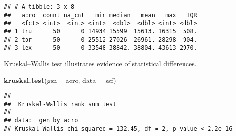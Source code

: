\documentclass[]{book}
\newenvironment{Shaded}{\begin{snugshade}}{\end{snugshade}}
\newcommand{\DataTypeTok}[1]{\textcolor[rgb]{0.13,0.29,0.53}{#1}}
\newcommand{\KeywordTok}[1]{\textcolor[rgb]{0.13,0.29,0.53}{\textbf{#1}}}
\newcommand{\NormalTok}[1]{#1}
\newcommand{\OperatorTok}[1]{\textcolor[rgb]{0.81,0.36,0.00}{\textbf{#1}}}
\newcommand{\OtherTok}[1]{\textcolor[rgb]{0.56,0.35,0.01}{#1}}
\newcommand{\StringTok}[1]{\textcolor[rgb]{0.31,0.60,0.02}{#1}}
\begin{document}
\begin{Shaded}
\end{Shaded}

\begin{verbatim}
## # A tibble: 3 x 8
##   acro  count na_cnt   min median   mean   max   IQR
##   <fct> <int>  <int> <int>  <dbl>  <dbl> <int> <dbl>
## 1 tru      50      0 14934 15599  15613. 16315  508.
## 2 tor      50      0 25512 27026  26961. 28298  904.
## 3 lex      50      0 33548 38842. 38804. 43613 2970.
\end{verbatim}

Kruskal--Wallis test illustrates evidence of statistical differences.

\begin{Shaded}
\begin{Highlighting}[]
\KeywordTok{kruskal.test}\NormalTok{(gen }\OperatorTok{~}\StringTok{ }\NormalTok{acro, }\DataTypeTok{data =}\NormalTok{ ssf)}
\end{Highlighting}
\end{Shaded}

\begin{verbatim}
## 
##  Kruskal-Wallis rank sum test
## 
## data:  gen by acro
## Kruskal-Wallis chi-squared = 132.45, df = 2, p-value < 2.2e-16
\end{verbatim}
\end{document}
